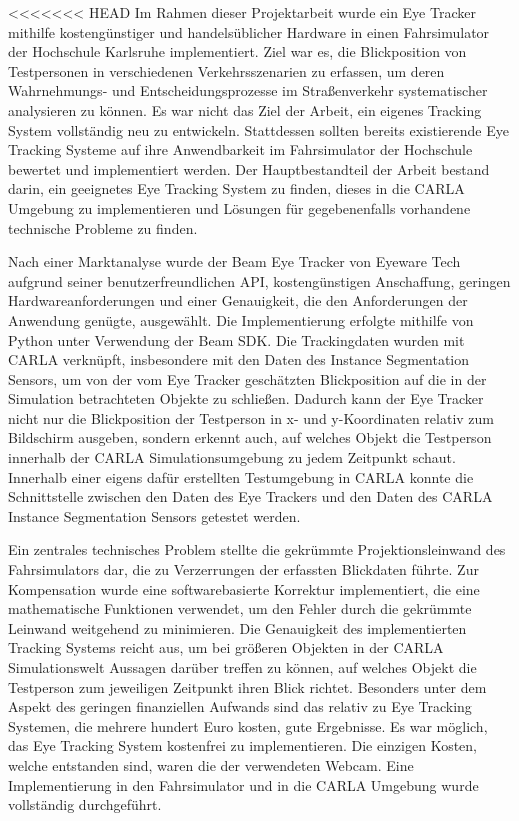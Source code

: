 
<<<<<<< HEAD
Im Rahmen dieser Projektarbeit wurde ein Eye Tracker mithilfe kostengünstiger und handelsüblicher Hardware in einen Fahrsimulator der Hochschule Karlsruhe implementiert. Ziel war es, die Blickposition von Testpersonen in verschiedenen Verkehrsszenarien zu erfassen, um deren Wahrnehmungs- und Entscheidungsprozesse im Straßenverkehr systematischer analysieren zu können. Es war nicht das Ziel der Arbeit, ein eigenes Tracking System vollständig neu zu entwickeln. Stattdessen sollten bereits existierende Eye Tracking Systeme auf ihre Anwendbarkeit im Fahrsimulator der Hochschule bewertet und implementiert werden. Der Hauptbestandteil der Arbeit bestand darin, ein geeignetes Eye Tracking System zu finden, dieses in die CARLA Umgebung zu implementieren und Lösungen für gegebenenfalls vorhandene technische Probleme zu finden. 

Nach einer Marktanalyse wurde der Beam Eye Tracker von Eyeware Tech aufgrund seiner benutzerfreundlichen API, kostengünstigen Anschaffung, geringen Hardwareanforderungen und einer Genauigkeit, die den Anforderungen der Anwendung genügte, ausgewählt. Die Implementierung erfolgte mithilfe von Python unter Verwendung der Beam SDK. Die Trackingdaten wurden mit CARLA verknüpft, insbesondere mit den Daten des Instance Segmentation Sensors, um von der vom Eye Tracker geschätzten Blickposition auf die in der Simulation betrachteten Objekte zu schließen. Dadurch kann der Eye Tracker nicht nur die Blickposition der Testperson in x- und y-Koordinaten relativ zum Bildschirm ausgeben, sondern erkennt auch, auf welches Objekt die Testperson innerhalb der CARLA Simulationsumgebung zu jedem Zeitpunkt schaut. Innerhalb einer eigens dafür erstellten Testumgebung in CARLA konnte die Schnittstelle zwischen den Daten des Eye Trackers und den Daten des CARLA Instance Segmentation Sensors getestet werden. 

Ein zentrales technisches Problem stellte die gekrümmte Projektionsleinwand des Fahrsimulators dar, die zu Verzerrungen der erfassten Blickdaten führte. Zur Kompensation wurde eine softwarebasierte Korrektur implementiert, die eine mathematische Funktionen verwendet, um den Fehler durch die gekrümmte Leinwand weitgehend zu minimieren. Die Genauigkeit des implementierten Tracking Systems reicht aus, um bei größeren Objekten in der CARLA Simulationswelt Aussagen darüber treffen zu können, auf welches Objekt die Testperson zum jeweiligen Zeitpunkt ihren Blick richtet. Besonders unter dem Aspekt des geringen finanziellen Aufwands sind das relativ zu Eye Tracking Systemen, die mehrere hundert Euro kosten, gute Ergebnisse. Es war möglich, das Eye Tracking System kostenfrei zu implementieren. Die einzigen Kosten, welche entstanden sind, waren die der verwendeten Webcam. Eine Implementierung in den Fahrsimulator und in die CARLA Umgebung wurde vollständig durchgeführt.

